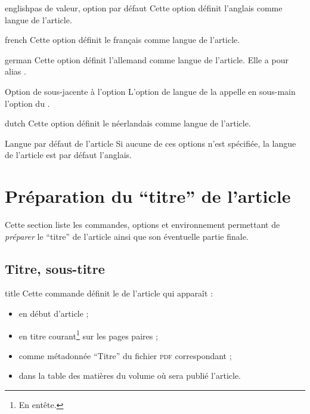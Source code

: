 \begin{docKey}{english}{}{pas de valeur, option par défaut}
  Cette option définit l'anglais comme langue de l'article.
\end{docKey}
\begin{docKey}{french}{}{}
  Cette option définit le français comme langue de l'article.
\end{docKey}
\begin{docKey}{german}{}{}
  Cette option définit l'allemand comme langue de l'article. Elle a pour alias
  .
  \begin{dbremark}{Option de  sous-jacente à l'option
      \protect{}}{}
    L'option de langue  de la \nwejmauthorcl{} appelle en
    sous-main l'option  du .
  \end{dbremark}
  \begin{docKey}{dutch}{}{}
  Cette option définit le néerlandais comme langue de l'article.
\end{docKey}
\end{docKey}

\begin{dbremark}{Langue par défaut de l'article}{}
  Si aucune de ces options n'est spécifiée, la langue de l'article est par
  défaut l'anglais.
\end{dbremark}

\section{Préparation du \enquote{titre} de l'article}
\label{sec-prep-de-lart}

Cette section liste les commandes, options et environnement permettant de
\emph{préparer} le \enquote{titre} de l'article ainsi que son éventuelle partie
finale.

\subsection{Titre, sous-titre}
\label{sec-titre}

\begin{docCommand}[doc description=\mandatory]{title}{}
  Cette commande définit le  de l'article qui apparaît :
  \begin{itemize}
  \item en début d'article ;
  \item en titre courant\footnote{En entête.} sur les pages paires ;
  \item comme métadonnée \enquote{Titre} du fichier \textsc{pdf} correspondant ;
  \item dans la table des matières du volume où sera publié l'article.
  \end{itemize}
\end{docCommand}

